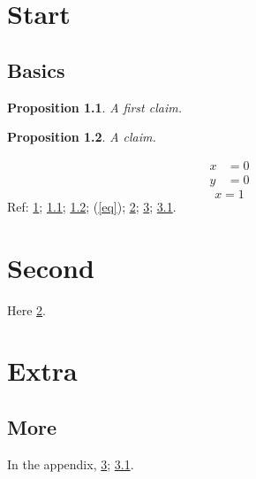 \documentclass{memoir}
\newtheorem{proposition}{Proposition}[chapter]
\begin{document}
\tableofcontents*
\chapter{Start}\label{start}
\section{Basics}\label{basics}
\begin{proposition}
A first claim.
\end{proposition}
\begin{proposition}\label{prop}
A claim.
\end{proposition}
\begin{align}
x &= 0 \\
y &= 0
\end{align}
\begin{equation}
x = 1 \label{eq}
\end{equation}
Ref: \ref{start}; \ref{basics}; \ref{prop}; (\ref{eq}); \ref{second}; \ref{extra}; \ref{extrasec}.
\chapter{Second}\label{second}
Here \ref{second}.
\appendix
\chapter{Extra}\label{extra}
\section{More}\label{extrasec}
In the appendix, \ref{extra}; \ref{extrasec}.
\end{document}
